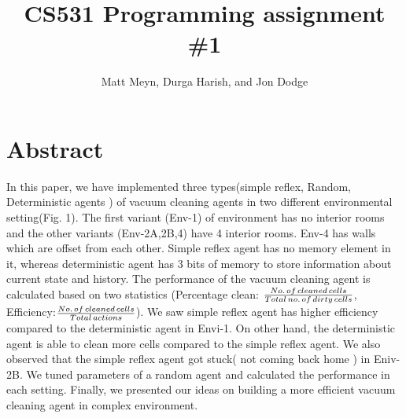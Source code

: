 \documentclass{article}
\title{CS531 Programming assignment \#1}
\author{Matt Meyn, Durga Harish, and Jon Dodge}
\begin{document}
\maketitle
\section{Abstract}

In this paper, we have implemented three types(simple reflex, Random, Deterministic agents ) of vacuum cleaning agents in two  different environmental setting(Fig. 1).   The first variant (Env-1) of environment has no interior rooms and the other variants (Env-2A,2B,4) have 4 interior rooms. Env-4 has walls which are offset from each other.   Simple reflex agent has no memory element in it, whereas  deterministic agent has 3 bits of memory to store information about current state and history.  The performance of the vacuum cleaning agent is calculated based on two statistics (Percentage clean: $\frac{No.\thinspace  of\thinspace  cleaned \thinspace cells}{Total\thinspace  no.\thinspace  of\thinspace  dirty \thinspace cells}$, Efficiency:$\frac{No.\thinspace  of \thinspace cleaned \thinspace cells}{Total\thinspace actions}$).   We saw simple reflex agent has higher efficiency compared to the deterministic agent in Envi-1.  On other hand, the deterministic agent is able to clean more cells compared to the simple reflex agent.  We also observed that the simple reflex agent got stuck( not coming back home ) in Eniv-2B.  We tuned parameters of a random agent and calculated the performance in each setting. Finally, we presented our ideas on building a more efficient vacuum cleaning agent in complex environment.  
\end{document}
